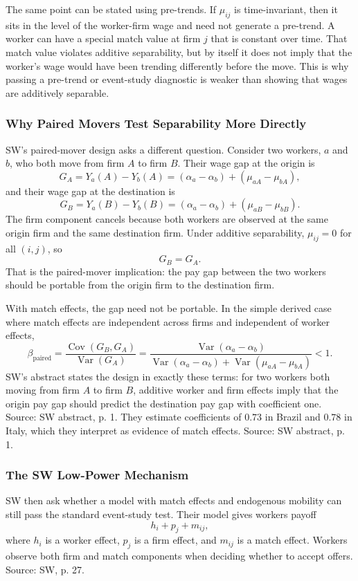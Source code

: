 ﻿\documentclass[11pt]{article}
\newcommand{\1}{\mathbf{1}}
\newcommand{\Var}{\operatorname{Var}}
\newcommand{\Cov}{\operatorname{Cov}}
\begin{document}
The same point can be stated using pre-trends. If $\mu_{ij}$ is time-invariant,
then it sits in the level of the worker-firm wage and need not generate a
pre-trend. A worker can have a special match value at firm $j$ that is constant
over time. That match value violates additive separability, but by itself it does
not imply that the worker's wage would have been trending differently before the
move. This is why passing a pre-trend or event-study diagnostic is weaker than
showing that wages are additively separable.

\subsubsection{Why Paired Movers Test Separability More Directly}

SW's paired-mover design asks a different question. Consider two workers, $a$ and
$b$, who both move from firm $A$ to firm $B$. Their wage gap at the origin is
\[
G_A
=
Y_a(A)-Y_b(A)
=
(\alpha_a-\alpha_b)+(\mu_{aA}-\mu_{bA}),
\]
and their wage gap at the destination is
\[
G_B
=
Y_a(B)-Y_b(B)
=
(\alpha_a-\alpha_b)+(\mu_{aB}-\mu_{bB}).
\]
The firm component cancels because both workers are observed at the same origin
firm and the same destination firm. Under additive separability, $\mu_{ij}=0$ for
all $(i,j)$, so
\[
G_B=G_A.
\]
That is the paired-mover implication: the pay gap between the two workers should
be portable from the origin firm to the destination firm.

With match effects, the gap need not be portable. In the simple derived case
where match effects are independent across firms and independent of worker
effects,
\[
\beta_{\mathrm{paired}}
=
\frac{\Cov(G_B,G_A)}{\Var(G_A)}
=
\frac{\Var(\alpha_a-\alpha_b)}
{\Var(\alpha_a-\alpha_b)+\Var(\mu_{aA}-\mu_{bA})}
<1.
\]
SW's abstract states the design in exactly these terms: for two workers both
moving from firm $A$ to firm $B$, additive worker and firm effects imply that the
origin pay gap should predict the destination pay gap with coefficient one.
Source: SW abstract, p. 1. They estimate coefficients of $0.73$ in Brazil and
$0.78$ in Italy, which they interpret as evidence of match effects. Source: SW
abstract, p. 1.

\subsubsection{The SW Low-Power Mechanism}

SW then ask whether a model with match effects and endogenous mobility can still
pass the standard event-study test. Their model gives workers payoff
\[
h_i+p_j+m_{ij},
\]
where $h_i$ is a worker effect, $p_j$ is a firm effect, and $m_{ij}$ is a match
effect. Workers observe both firm and match components when deciding whether to
accept offers. Source: SW, p. 27.
\end{document}
